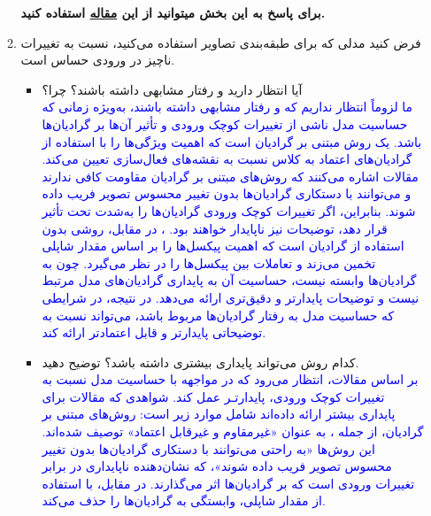 \documentclass[12pt]{article}
\begin{document}
\begin{enumerate}
\begin{enumerate}
         \textbf{برای پاسخ به این بخش میتوانید از این \href{https://arxiv.org/pdf/2412.16003}{مقاله} استفاده کنید.}
         \vspace{1cm}
         \item فرض کنید مدلی که برای طبقه‌بندی تصاویر استفاده می‌کنید، نسبت به تغییرات ناچیز در ورودی حساس است.
         \begin{itemize}
             \item آیا انتظار دارید  و  رفتار مشابهی داشته باشند؟ چرا؟\\
             \textcolor{blue}{
             ما لزوماً انتظار نداریم که  و  رفتار مشابهی داشته باشند، به‌ویژه زمانی که حساسیت مدل ناشی از تغییرات کوچک ورودی و تأثیر آن‌ها بر گرادیان‌ها باشد.
             یک روش مبتنی بر گرادیان است که اهمیت ویژگی‌ها را با استفاده از گرادیان‌های اعتماد به کلاس نسبت به نقشه‌های فعال‌سازی تعیین می‌کند. مقالات اشاره می‌کنند که روش‌های مبتنی بر گرادیان مقاومت کافی ندارند و می‌توانند با دستکاری گرادیان‌ها بدون تغییر محسوس تصویر فریب داده شوند. بنابراین، اگر تغییرات کوچک ورودی گرادیان‌ها را به‌شدت تحت تأثیر قرار دهد، توضیحات  نیز ناپایدار خواهند بود.
            ، در مقابل، روشی بدون استفاده از گرادیان است که اهمیت پیکسل‌ها را بر اساس مقدار شاپلی تخمین می‌زند و تعاملات بین پیکسل‌ها را در نظر می‌گیرد. چون به گرادیان‌ها وابسته نیست، حساسیت آن به پایداری گرادیان‌های مدل مرتبط نیست و توضیحات پایدارتر و دقیق‌تری ارائه می‌دهد.
            در نتیجه، در شرایطی که حساسیت مدل به رفتار گرادیان‌ها مربوط باشد،  می‌تواند نسبت به  توضیحاتی پایدارتر و قابل اعتمادتر ارائه کند.
             }
             \item کدام روش می‌تواند پایداری بیشتری داشته باشد؟ توضیح دهید.\\
             \textcolor{blue}{
             بر اساس مقالات، انتظار می‌رود که  در مواجهه با حساسیت مدل نسبت به تغییرات کوچک ورودی، پایدارتـر عمل کند.
            شواهدی که مقالات برای پایداری بیشتر  ارائه داده‌اند شامل موارد زیر است:
            روش‌های مبتنی بر گرادیان، از جمله ، به عنوان «غیرمقاوم و غیرقابل اعتماد» توصیف شده‌اند.
            این روش‌ها «به راحتی می‌توانند با دستکاری گرادیان‌ها بدون تغییر محسوس تصویر فریب داده شوند»، که نشان‌دهنده ناپایداری در برابر تغییرات ورودی است که بر گرادیان‌ها اثر می‌گذارند.
            در مقابل،  با استفاده از مقدار شاپلی، وابستگی به گرادیان‌ها را حذف می‌کند.
}
\end{itemize}
\end{enumerate}
\end{enumerate}
\end{document}
